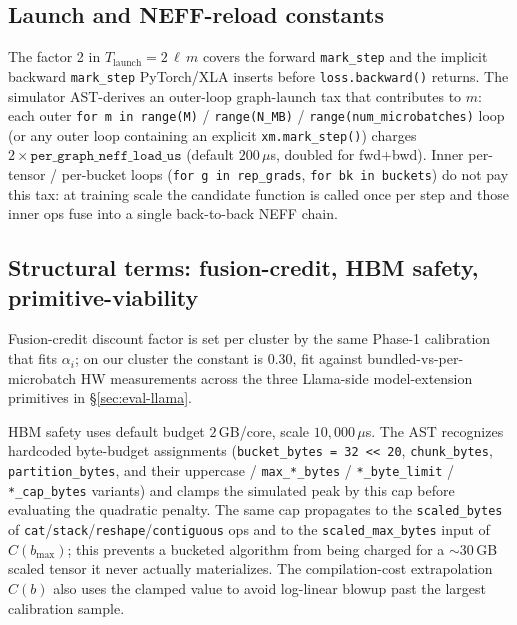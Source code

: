 \subsection{Launch and NEFF-reload constants}
\label{sec:cost-impl-launch}

The factor 2 in $T_{\text{launch}} = 2\,\ell\,m$ covers the
forward \texttt{mark\_step} and the implicit backward
\texttt{mark\_step} PyTorch/XLA inserts before
\texttt{loss.backward()} returns. The simulator AST-derives an
outer-loop graph-launch tax that contributes to $m$: each outer
\texttt{for m in range(M)} / \texttt{range(N\_MB)} /
\texttt{range(num\_microbatches)} loop (or any outer loop
containing an explicit \texttt{xm.mark\_step()}) charges
$2 \times \texttt{per\_graph\_neff\_load\_us}$ (default
$200\,\mu$s, doubled for fwd$+$bwd). Inner per-tensor / per-bucket
loops (\texttt{for g in rep\_grads}, \texttt{for bk in buckets})
do not pay this tax: at training scale the candidate function is
called once per step and those inner ops fuse into a single
back-to-back NEFF chain.

\subsection{Structural terms: fusion-credit, HBM safety,
primitive-viability}
\label{sec:cost-impl-struct}

Fusion-credit discount factor is set per cluster by the same
Phase-1 calibration that fits $\alpha_i$; on our cluster the
constant is $0.30$, fit against bundled-vs-per-microbatch HW
measurements across the three Llama-side model-extension
primitives in §\ref{sec:eval-llama}.

HBM safety uses default budget $2$\,GB/core, scale $10{,}000\,\mu$s.
The AST recognizes hardcoded byte-budget assignments
(\texttt{bucket\_bytes = 32 << 20}, \texttt{chunk\_bytes},
\texttt{partition\_bytes}, and their uppercase /
\texttt{max\_*\_bytes} / \texttt{*\_byte\_limit} /
\texttt{*\_cap\_bytes} variants) and clamps the simulated peak by
this cap before evaluating the quadratic penalty. The same cap
propagates to the \texttt{scaled\_bytes} of
\texttt{cat}/\texttt{stack}/\texttt{reshape}/\texttt{contiguous}
ops and to the \texttt{scaled\_max\_bytes} input of
$C(b_{\max})$; this prevents a bucketed algorithm from being
charged for a $\sim$30\,GB scaled tensor it never actually
materializes. The compilation-cost extrapolation $\hat C(b)$ also
uses the clamped value to avoid log-linear blowup past the largest
calibration sample.

